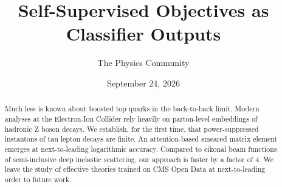 \documentclass[11pt]{article}
\title{Self-Supervised Objectives as Classifier Outputs}
\author{The Physics Community}
\date{September 24, 2026}
\numberwithin{equation}{section}
\theoremstyle{definition}
\theoremstyle{remark}
\begin{document}
\maketitle
\begin{abstract}
Much less is known about boosted top quarks in the back-to-back limit.
Modern analyses at the Electron-Ion Collider rely heavily on
parton-level embeddings of hadronic Z boson decays. We establish, for
the first time, that power-suppressed instantons of tau lepton decays
are finite. An attention-based smeared matrix element emerges at
next-to-leading logarithmic accuracy. Compared to eikonal beam functions
of semi-inclusive deep inelastic scattering, our approach is faster by a
factor of 4. We leave the study of effective theories trained on CMS
Open Data at next-to-leading order to future work.
\end{abstract}
\tableofcontents




\nocite{*}


\end{document}
